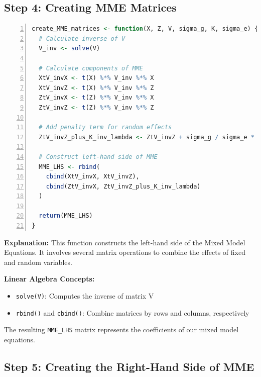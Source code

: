\documentclass[12pt,a4paper]{article}
\begin{document}
\subsection{Step 4: Creating MME Matrices}

\begin{lstlisting}[language=R, 
                   caption=Step 2: Defining Variance Components,
                   basicstyle=\ttfamily\footnotesize,
                   keywordstyle=\color{blue},
                   stringstyle=\color{red},
                   commentstyle=\color{green!60!black},
                   numbers=left,
                   numberstyle=\tiny\color{gray},
                   frame=single,
                   breaklines=true,
                   linewidth=0.95\textwidth,
                   columns=flexible,
                   xleftmargin=0.05\textwidth,
                   xrightmargin=0.05\textwidth]
create_MME_matrices <- function(X, Z, V, sigma_g, K, sigma_e) {
  # Calculate inverse of V
  V_inv <- solve(V)
  
  # Calculate components of MME
  XtV_invX <- t(X) %*% V_inv %*% X
  XtV_invZ <- t(X) %*% V_inv %*% Z
  ZtV_invX <- t(Z) %*% V_inv %*% X
  ZtV_invZ <- t(Z) %*% V_inv %*% Z
  
  # Add penalty term for random effects
  ZtV_invZ_plus_K_inv_lambda <- ZtV_invZ + sigma_g / sigma_e * solve(K)
  
  # Construct left-hand side of MME
  MME_LHS <- rbind(
    cbind(XtV_invX, XtV_invZ),
    cbind(ZtV_invX, ZtV_invZ_plus_K_inv_lambda)
  )
  
  return(MME_LHS)
}
\end{lstlisting}

\textbf{Explanation:}
This function constructs the left-hand side of the Mixed Model Equations. It involves several matrix operations to combine the effects of fixed and random variables.

\textbf{Linear Algebra Concepts:}
\begin{itemize}
  \item \texttt{solve(V)}: Computes the inverse of matrix V
  \item \texttt{rbind()} and \texttt{cbind()}: Combine matrices by rows and columns, respectively
\end{itemize}

The resulting \texttt{MME\_LHS} matrix represents the coefficients of our mixed model equations.

\subsection{Step 5: Creating the Right-Hand Side of MME}
\end{document}
